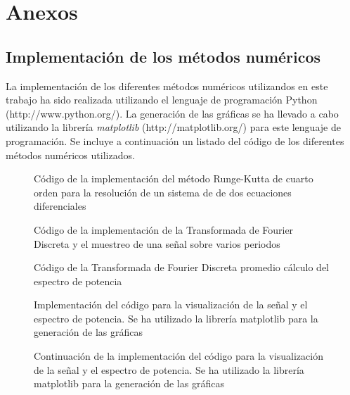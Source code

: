 \documentclass[11pt]{article}
\begin{document}
\pagebreak
\section{Anexos}

\subsection{Implementación de los métodos numéricos}
La implementación de los diferentes métodos numéricos utilizandos en este trabajo ha sido realizada utilizando el lenguaje de programación Python (http://www.python.org/). La generación de las gráficas se ha llevado a cabo utilizando la librería \textit{matplotlib} (http://matplotlib.org/) para este lenguaje de programación. Se incluye a continuación un listado del código de los diferentes métodos numéricos utilizados.

\begin{figure}

\caption{Código de la implementación del método Runge-Kutta de cuarto orden para la resolución de un sistema de de dos ecuaciones diferenciales}
\label{runge_kutta_code}
\end{figure}

\begin{figure}

\caption{Código de la implementación de la Transformada de Fourier Discreta y el muestreo de una señal sobre varios periodos}
\end{figure}

\begin{figure}

\caption{Código de la Transformada de Fourier Discreta promedio cálculo del espectro de potencia}
\end{figure}

\begin{figure}

\caption{Implementación del código para la visualización de la señal y el espectro de potencia.
Se ha utilizado la librería matplotlib para la generación de las gráficas}
\end{figure}

\begin{figure}

\caption{Continuación de la implementación del código para la visualización de la señal y el espectro de potencia.
Se ha utilizado la librería matplotlib para la generación de las gráficas}
\end{figure}
\end{document}
